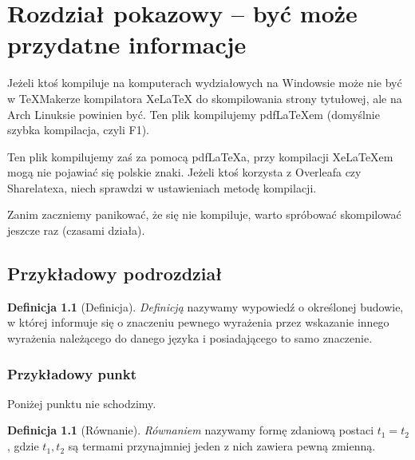 \documentclass[a4paper,11pt,twoside]{report}
\theoremstyle{definition}
\newtheorem{definition}[theorem]{Definicja}
\begin{document}
\chapter{Rozdział pokazowy -- być może przydatne informacje}

Jeżeli ktoś kompiluje na komputerach wydziałowych na Windowsie może nie być w TeXMakerze kompilatora XeLaTeX do skompilowania strony tytułowej, ale na Arch Linuksie powinien być. Ten plik kompilujemy pdfLaTeXem (domyślnie szybka kompilacja, czyli F1).

Ten plik kompilujemy zaś za pomocą pdfLaTeXa, przy kompilacji XeLaTeXem mogą nie pojawiać się polskie znaki. Jeżeli ktoś korzysta z Overleafa czy Sharelatexa, niech sprawdzi w ustawieniach metodę kompilacji.

Zanim zaczniemy panikować, że się nie kompiluje, warto spróbować skompilować jeszcze raz (czasami działa).


\section{Przykładowy podrozdział}

\begin{definition}[Definicja]
  \emph{Definicją} nazywamy wypowiedź o określonej budowie, w której informuje się o znaczeniu pewnego wyrażenia przez wskazanie innego wyrażenia należącego do danego języka i posiadającego to samo znaczenie.
\end{definition}

\subsection{Przykładowy punkt}

Poniżej punktu nie schodzimy.

\begin{definition}[Równanie]
  \emph{Równaniem} nazywamy formę zdaniową postaci $t_1 = t_2$, gdzie $t_1, t_2$ są termami przynajmniej jeden z nich zawiera pewną zmienną.
\end{definition}
\end{document}
